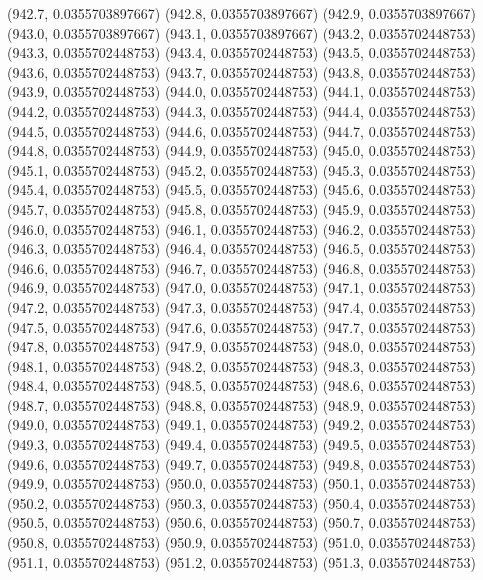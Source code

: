 {					(942.7, 0.0355703897667)
					(942.8, 0.0355703897667)
					(942.9, 0.0355703897667)
					(943.0, 0.0355703897667)
					(943.1, 0.0355703897667)
					(943.2, 0.0355702448753)
					(943.3, 0.0355702448753)
					(943.4, 0.0355702448753)
					(943.5, 0.0355702448753)
					(943.6, 0.0355702448753)
					(943.7, 0.0355702448753)
					(943.8, 0.0355702448753)
					(943.9, 0.0355702448753)
					(944.0, 0.0355702448753)
					(944.1, 0.0355702448753)
					(944.2, 0.0355702448753)
					(944.3, 0.0355702448753)
					(944.4, 0.0355702448753)
					(944.5, 0.0355702448753)
					(944.6, 0.0355702448753)
					(944.7, 0.0355702448753)
					(944.8, 0.0355702448753)
					(944.9, 0.0355702448753)
					(945.0, 0.0355702448753)
					(945.1, 0.0355702448753)
					(945.2, 0.0355702448753)
					(945.3, 0.0355702448753)
					(945.4, 0.0355702448753)
					(945.5, 0.0355702448753)
					(945.6, 0.0355702448753)
					(945.7, 0.0355702448753)
					(945.8, 0.0355702448753)
					(945.9, 0.0355702448753)
					(946.0, 0.0355702448753)
					(946.1, 0.0355702448753)
					(946.2, 0.0355702448753)
					(946.3, 0.0355702448753)
					(946.4, 0.0355702448753)
					(946.5, 0.0355702448753)
					(946.6, 0.0355702448753)
					(946.7, 0.0355702448753)
					(946.8, 0.0355702448753)
					(946.9, 0.0355702448753)
					(947.0, 0.0355702448753)
					(947.1, 0.0355702448753)
					(947.2, 0.0355702448753)
					(947.3, 0.0355702448753)
					(947.4, 0.0355702448753)
					(947.5, 0.0355702448753)
					(947.6, 0.0355702448753)
					(947.7, 0.0355702448753)
					(947.8, 0.0355702448753)
					(947.9, 0.0355702448753)
					(948.0, 0.0355702448753)
					(948.1, 0.0355702448753)
					(948.2, 0.0355702448753)
					(948.3, 0.0355702448753)
					(948.4, 0.0355702448753)
					(948.5, 0.0355702448753)
					(948.6, 0.0355702448753)
					(948.7, 0.0355702448753)
					(948.8, 0.0355702448753)
					(948.9, 0.0355702448753)
					(949.0, 0.0355702448753)
					(949.1, 0.0355702448753)
					(949.2, 0.0355702448753)
					(949.3, 0.0355702448753)
					(949.4, 0.0355702448753)
					(949.5, 0.0355702448753)
					(949.6, 0.0355702448753)
					(949.7, 0.0355702448753)
					(949.8, 0.0355702448753)
					(949.9, 0.0355702448753)
					(950.0, 0.0355702448753)
					(950.1, 0.0355702448753)
					(950.2, 0.0355702448753)
					(950.3, 0.0355702448753)
					(950.4, 0.0355702448753)
					(950.5, 0.0355702448753)
					(950.6, 0.0355702448753)
					(950.7, 0.0355702448753)
					(950.8, 0.0355702448753)
					(950.9, 0.0355702448753)
					(951.0, 0.0355702448753)
					(951.1, 0.0355702448753)
					(951.2, 0.0355702448753)
					(951.3, 0.0355702448753)
}
